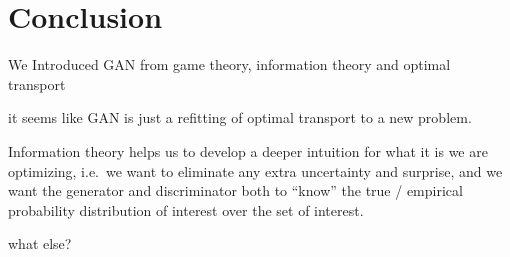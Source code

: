 \section{Conclusion}

We
Introduced GAN from game theory, information theory and optimal
transport

it seems like GAN is just a refitting of optimal transport to a new
problem.

Information theory helps us to develop a deeper intuition for what it
is we are optimizing, i.e.\ we want to eliminate any extra uncertainty
and surprise, and we want the generator and discriminator both to
``know'' the true / empirical probability distribution of interest
over the set of interest.

what else?

